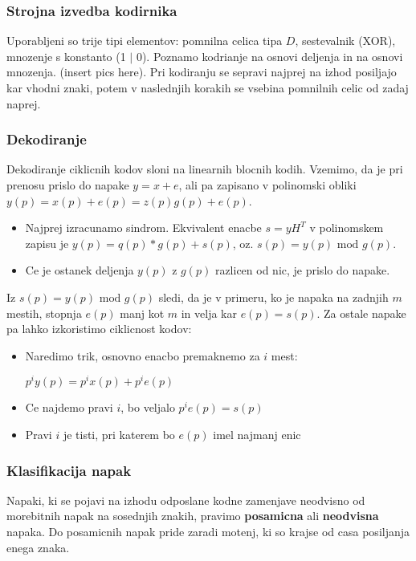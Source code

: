 \documentclass{article}
\begin{document}
\begin{multicols}{2}
	\subsubsection{Strojna izvedba kodirnika}
	Uporabljeni so trije tipi elementov: pomnilna celica tipa $D$, sestevalnik (XOR), mnozenje s konstanto (1 $|$ 0).
	Poznamo kodrianje na osnovi deljenja in na osnovi mnozenja. (insert pics here).
	Pri kodiranju se sepravi najprej na izhod posiljajo kar vhodni znaki, potem v naslednjih korakih se vsebina pomnilnih celic od zadaj naprej.

	\subsubsection{Dekodiranje}
	Dekodiranje ciklicnih kodov sloni na linearnih blocnih kodih. Vzemimo, da je pri prenosu prislo do napake $y = x + e$, ali pa zapisano v polinomski
	obliki $y(p) = x(p) + e(p) = z(p)g(p) + e(p)$.
	\begin{itemize}
		\item Najprej izracunamo sindrom. Ekvivalent enacbe $s = yH^T$ v polinomskem zapisu je $y(p) = q(p)*g(p) + s(p)$, oz. $s(p) = y(p) \text{ mod } g(p)$.
		\item Ce je ostanek deljenja $y(p)$ z $g(p)$ razlicen od nic, je prislo do napake.
	\end{itemize}
	Iz $s(p) = y(p) \text{ mod } g(p)$ sledi, da je v primeru, ko je napaka na zadnjih $m$ mestih, stopnja $e(p)$ manj kot $m$ in velja kar $e(p) = s(p)$.
	Za ostale napake pa lahko izkoristimo ciklicnost kodov:
	\begin{itemize}
		\item Naredimo trik, osnovno enacbo premaknemo za $i$ mest:
		      \begin{center}
			      $p^iy(p) = p^ix(p) + p^i e(p)$
		      \end{center}
		\item Ce najdemo pravi $i$, bo veljalo $p^i e(p) = s(p)$
		\item Pravi $i$ je tisti, pri katerem bo $e(p)$ imel najmanj enic
	\end{itemize}

	\subsubsection{Klasifikacija napak}
	Napaki, ki se pojavi na izhodu odposlane kodne zamenjave neodvisno od morebitnih napak
	na sosednjih znakih, pravimo \textbf{posamicna} ali \textbf{neodvisna} napaka. Do posamicnih
	napak pride zaradi motenj, ki so krajse od casa posiljanja enega znaka.


\end{multicols}
\end{document}

